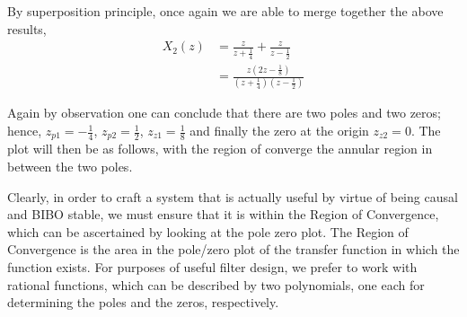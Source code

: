 \documentclass[\documentfontsize, twocolumn]{\classname}
\begin{document}
By superposition principle, once again we are able to merge together the above results,
\begin{align*}
    X_2(z)  &= \frac{z}{z + \frac 1 4} + \frac{z}{z - \frac 1 2} \\
            &= \frac {
                z\left(2z - \frac 1 8\right)
            } {
                \left(z + \frac 1 4\right)\left(z - \frac 1 2\right)
            }
\end{align*}

Again by observation one can conclude that there are two poles and two zeros; hence, $z_{p1} = -\frac 1 4$, $z_{p2} = \frac 1 2$, $z_{z1} = \frac 1 8$ and finally the zero at the origin $z_{z2} = 0$. The plot will then be as follows, with the region of converge the annular region in between the two poles.

\begin{center}
\end{center}

Clearly, in order to craft a system that is actually useful by virtue of being causal and BIBO stable, we must ensure that it is within the Region of Convergence, which can be ascertained by looking at the pole zero plot. The Region of Convergence is the area in the pole/zero plot of the transfer function in which the function exists. For purposes of useful filter design, we prefer to work with rational functions, which can be described by two polynomials, one each for determining the poles and the zeros, respectively.
\end{document}
